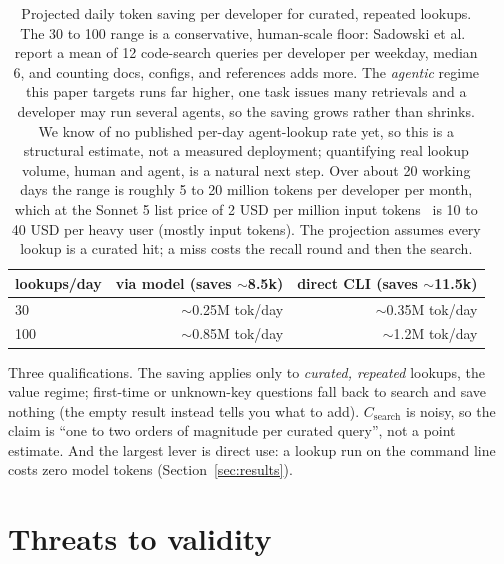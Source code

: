 \documentclass[11pt]{article}
\begin{document}
\begin{table}[h]
\centering
\begin{tabular}{lrr}
\toprule
\textbf{lookups/day} & \textbf{via model (saves $\sim$8.5k)} & \textbf{direct CLI (saves $\sim$11.5k)} \\
\midrule
30  & $\sim$0.25M tok/day & $\sim$0.35M tok/day \\
100 & $\sim$0.85M tok/day & $\sim$1.2M tok/day \\
\bottomrule
\end{tabular}
\caption{Projected daily token saving per developer for curated, repeated lookups.
The 30 to 100 range is a conservative, human-scale floor: Sadowski et al.~\cite{sadowski2015} report
a mean of 12 code-search queries per developer per weekday, median 6, and
counting docs, configs, and references adds more. The \emph{agentic} regime this paper targets runs far higher,
one task issues many retrievals and a developer may run several agents, so the
saving grows rather than shrinks. We know of no published per-day agent-lookup rate
yet, so this is a structural estimate, not a measured deployment; quantifying real
lookup volume, human and agent, is a natural next step. Over about 20 working days
the range is roughly 5 to 20 million tokens per developer per month, which at the
Sonnet 5 list price of 2 USD per million input tokens~\cite{pricing} is 10 to
40 USD per heavy user (mostly input tokens). The projection assumes every lookup
is a curated hit; a miss costs the recall round and then the search.}
\label{tab:savings}
\end{table}

Three qualifications. The saving applies only to \emph{curated, repeated} lookups,
the value regime; first-time or unknown-key questions fall back to search and save
nothing (the empty result instead tells you what to add). $C_{\mathrm{search}}$ is
noisy, so the claim is ``one to two orders of magnitude per curated
query'', not a point estimate. And the largest lever is direct use: a lookup run on
the command line costs zero model tokens (Section~\ref{sec:results}).

\section{Threats to validity}
\end{document}
